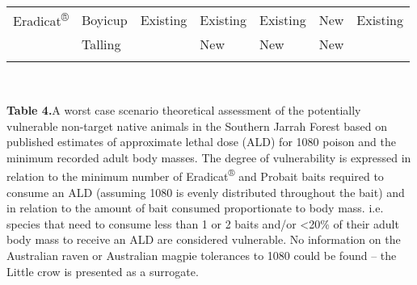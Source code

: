 \documentclass[version=last,
    paper=a4,                               %
    10pt,                                   %
    dvipsnames,
    oneside,                              %
    headings=openany,                       %
    open=any,
    BCOR=7mm,                               %
    DIV=15,     %
]{scrbook}
\begin{document}
\begin{longtable}[c]{@{}lllllll@{}}
\begin{minipage}[t]{0.12\columnwidth}\raggedright
Eradicat\textsuperscript{®}
\end{minipage} & \begin{minipage}[t]{0.12\columnwidth}\raggedright
Boyicup
\end{minipage} & \begin{minipage}[t]{0.12\columnwidth}\raggedright
Existing
\end{minipage} & \begin{minipage}[t]{0.12\columnwidth}\raggedright
Existing
\end{minipage} & \begin{minipage}[t]{0.12\columnwidth}\raggedright
Existing
\end{minipage} & \begin{minipage}[t]{0.12\columnwidth}\raggedright
New
\end{minipage} & \begin{minipage}[t]{0.12\columnwidth}\raggedright
Existing
\end{minipage}
\\\addlinespace
\begin{minipage}[t]{0.12\columnwidth}\raggedright
~
\end{minipage} & \begin{minipage}[t]{0.12\columnwidth}\raggedright
Talling
\end{minipage} & \begin{minipage}[t]{0.12\columnwidth}\raggedright
~
\end{minipage} & \begin{minipage}[t]{0.12\columnwidth}\raggedright
New
\end{minipage} & \begin{minipage}[t]{0.12\columnwidth}\raggedright
New
\end{minipage} & \begin{minipage}[t]{0.12\columnwidth}\raggedright
New
\end{minipage} & \begin{minipage}[t]{0.12\columnwidth}\raggedright
~
\end{minipage}
\\\addlinespace
\bottomrule
\end{longtable}

~

\textbf{Table 4.}A worst case scenario theoretical assessment of the
potentially vulnerable non-target native animals in the Southern Jarrah
Forest based on published estimates of approximate lethal dose (ALD) for
1080 poison and the minimum recorded adult body masses. The degree of
vulnerability is expressed in relation to the minimum number of
Eradicat\textsuperscript{®} and Probait baits required to consume an ALD
(assuming 1080 is evenly distributed throughout the bait) and in
relation to the amount of bait consumed proportionate to body mass. i.e.
species that need to consume less than 1 or 2 baits and/or
\textless{}20\% of their adult body mass to receive an ALD are
considered vulnerable. No information on the Australian raven or
Australian magpie tolerances to 1080 could be found -- the Little crow
is presented as a surrogate.
\end{document}
